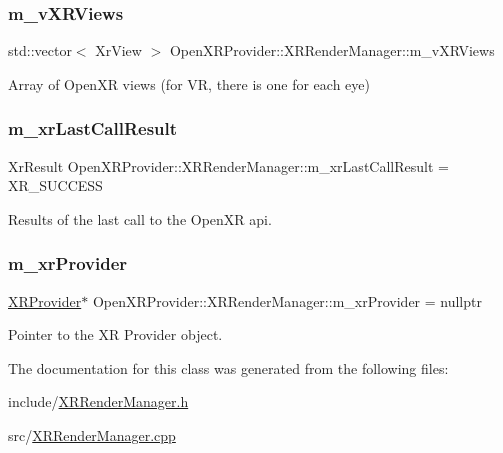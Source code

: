 \subsubsection{\texorpdfstring{m\_vXRViews}{m\_vXRViews}}
{\footnotesize\ttfamily std\+::vector$<$ Xr\+View $>$ Open\+X\+R\+Provider\+::\+X\+R\+Render\+Manager\+::m\+\_\+v\+X\+R\+Views\hspace{0.3cm}{\ttfamily [private]}}



Array of Open\+XR views (for VR, there is one for each eye) 

\mbox{\label{class_open_x_r_provider_1_1_x_r_render_manager_a85321909f010e4314693433c83c14b2d}} 
\subsubsection{\texorpdfstring{m\_xrLastCallResult}{m\_xrLastCallResult}}
{\footnotesize\ttfamily Xr\+Result Open\+X\+R\+Provider\+::\+X\+R\+Render\+Manager\+::m\+\_\+xr\+Last\+Call\+Result = X\+R\+\_\+\+S\+U\+C\+C\+E\+SS\hspace{0.3cm}{\ttfamily [private]}}



Results of the last call to the Open\+XR api. 

\mbox{\label{class_open_x_r_provider_1_1_x_r_render_manager_a93496eb096c4b871d404db68d01787a8}} 
\subsubsection{\texorpdfstring{m\_xrProvider}{m\_xrProvider}}
{\footnotesize\ttfamily \mbox{\hyperlink{class_open_x_r_provider_1_1_x_r_provider}{X\+R\+Provider}}$\ast$ Open\+X\+R\+Provider\+::\+X\+R\+Render\+Manager\+::m\+\_\+xr\+Provider = nullptr\hspace{0.3cm}{\ttfamily [private]}}



Pointer to the XR Provider object. 



The documentation for this class was generated from the following files\+:\begin{DoxyCompactItemize}
\item 
include/\mbox{\hyperlink{_x_r_render_manager_8h}{X\+R\+Render\+Manager.\+h}}\item 
src/\mbox{\hyperlink{_x_r_render_manager_8cpp}{X\+R\+Render\+Manager.\+cpp}}\end{DoxyCompactItemize}
